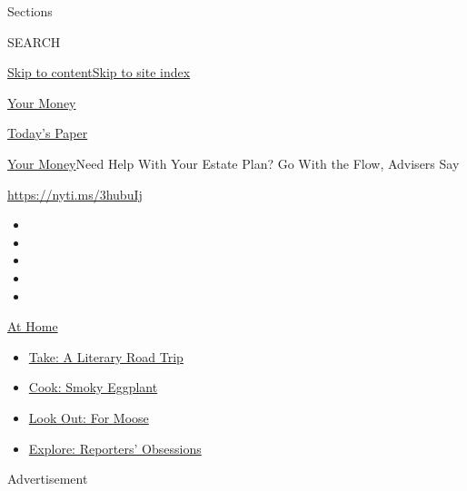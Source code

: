 Sections

SEARCH

\protect\hyperlink{site-content}{Skip to
content}\protect\hyperlink{site-index}{Skip to site index}

\href{https://www.nytimes.com/section/your-money}{Your Money}

\href{https://myaccount.nytimes.com/auth/login?response_type=cookie\&client_id=vi}{}

\href{https://www.nytimes.com/section/todayspaper}{Today's Paper}

\href{/section/your-money}{Your Money}\textbar{}Need Help With Your
Estate Plan? Go With the Flow, Advisers Say

\url{https://nyti.ms/3hubuIj}

\begin{itemize}
\item
\item
\item
\item
\item
\end{itemize}

\href{https://www.nytimes.com/spotlight/at-home?action=click\&pgtype=Article\&state=default\&region=TOP_BANNER\&context=at_home_menu}{At
Home}

\begin{itemize}
\tightlist
\item
  \href{https://www.nytimes.com/2020/07/28/books/time-for-a-literary-road-trip.html?action=click\&pgtype=Article\&state=default\&region=TOP_BANNER\&context=at_home_menu}{Take:
  A Literary Road Trip}
\item
  \href{https://www.nytimes.com/2020/07/29/magazine/bored-with-your-home-cooking-some-smoky-eggplant-will-fix-that.html?action=click\&pgtype=Article\&state=default\&region=TOP_BANNER\&context=at_home_menu}{Cook:
  Smoky Eggplant}
\item
  \href{https://www.nytimes.com/2020/07/27/travel/moose-michigan-isle-royale.html?action=click\&pgtype=Article\&state=default\&region=TOP_BANNER\&context=at_home_menu}{Look
  Out: For Moose}
\item
  \href{https://www.nytimes.com/interactive/2020/at-home/even-more-reporters-editors-diaries-lists-recommendations.html?action=click\&pgtype=Article\&state=default\&region=TOP_BANNER\&context=at_home_menu}{Explore:
  Reporters' Obsessions}
\end{itemize}

Advertisement

